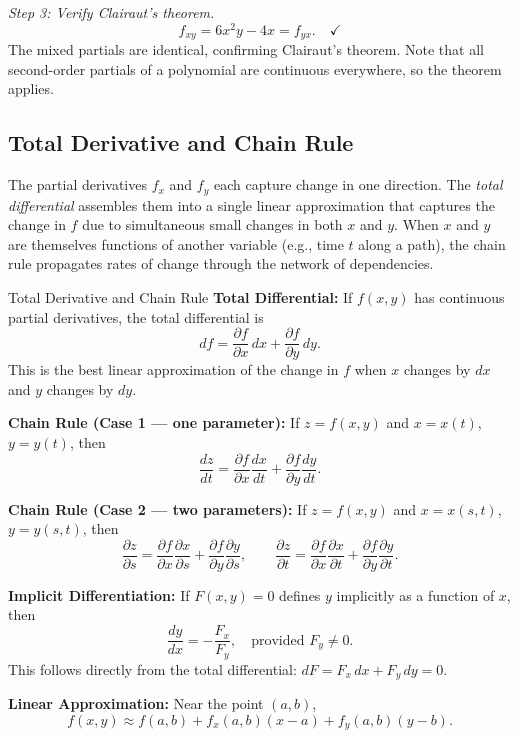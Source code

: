 \documentclass[12pt,a4paper]{article}
\begin{document}
\textit{Step 3: Verify Clairaut's theorem.}
\[
f_{xy} = 6x^2 y - 4x = f_{yx}. \quad \checkmark
\]
The mixed partials are identical, confirming Clairaut's theorem. Note that all second-order partials of a polynomial are continuous everywhere, so the theorem applies.

\subsection{Total Derivative and Chain Rule}

The partial derivatives \(f_x\) and \(f_y\) each capture change in one direction. The \textit{total differential} assembles them into a single linear approximation that captures the change in \(f\) due to simultaneous small changes in both \(x\) and \(y\). When \(x\) and \(y\) are themselves functions of another variable (e.g., time \(t\) along a path), the chain rule propagates rates of change through the network of dependencies.

\begin{infobox}{Total Derivative and Chain Rule}
\textbf{Total Differential:} If \(f(x,y)\) has continuous partial derivatives, the total differential is
\[
df = \frac{\partial f}{\partial x}\,dx + \frac{\partial f}{\partial y}\,dy.
\]
This is the best linear approximation of the change in \(f\) when \(x\) changes by \(dx\) and \(y\) changes by \(dy\).

\textbf{Chain Rule (Case 1 --- one parameter):} If \(z = f(x,y)\) and \(x = x(t)\), \(y = y(t)\), then
\[
\frac{dz}{dt} = \frac{\partial f}{\partial x}\frac{dx}{dt} + \frac{\partial f}{\partial y}\frac{dy}{dt}.
\]

\textbf{Chain Rule (Case 2 --- two parameters):} If \(z = f(x,y)\) and \(x = x(s,t)\), \(y = y(s,t)\), then
\[
\frac{\partial z}{\partial s} = \frac{\partial f}{\partial x}\frac{\partial x}{\partial s} + \frac{\partial f}{\partial y}\frac{\partial y}{\partial s}, \qquad
\frac{\partial z}{\partial t} = \frac{\partial f}{\partial x}\frac{\partial x}{\partial t} + \frac{\partial f}{\partial y}\frac{\partial y}{\partial t}.
\]

\textbf{Implicit Differentiation:} If \(F(x,y) = 0\) defines \(y\) implicitly as a function of \(x\), then
\[
\frac{dy}{dx} = -\frac{F_x}{F_y}, \quad \text{provided } F_y \neq 0.
\]
This follows directly from the total differential: \(dF = F_x\,dx + F_y\,dy = 0\).

\textbf{Linear Approximation:} Near the point \((a,b)\),
\[
f(x,y) \approx f(a,b) + f_x(a,b)(x-a) + f_y(a,b)(y-b).
\]
\end{infobox}
\end{document}
